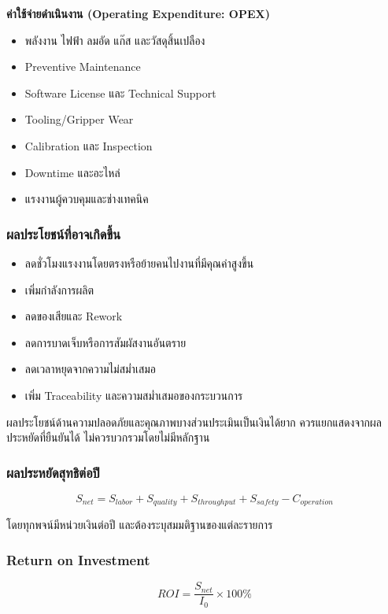 \textbf{ค่าใช้จ่ายดำเนินงาน (Operating Expenditure: OPEX)}

\begin{itemize}
    \item พลังงาน ไฟฟ้า ลมอัด แก๊ส และวัสดุสิ้นเปลือง
    \item Preventive Maintenance
    \item Software License และ Technical Support
    \item Tooling/Gripper Wear
    \item Calibration และ Inspection
    \item Downtime และอะไหล่
    \item แรงงานผู้ควบคุมและช่างเทคนิค
\end{itemize}

\subsubsection{ผลประโยชน์ที่อาจเกิดขึ้น}

\begin{itemize}
    \item ลดชั่วโมงแรงงานโดยตรงหรือย้ายคนไปงานที่มีคุณค่าสูงขึ้น
    \item เพิ่มกำลังการผลิต
    \item ลดของเสียและ Rework
    \item ลดการบาดเจ็บหรือการสัมผัสงานอันตราย
    \item ลดเวลาหยุดจากความไม่สม่ำเสมอ
    \item เพิ่ม Traceability และความสม่ำเสมอของกระบวนการ
\end{itemize}

ผลประโยชน์ด้านความปลอดภัยและคุณภาพบางส่วนประเมินเป็นเงินได้ยาก ควรแยกแสดงจากผลประหยัดที่ยืนยันได้ ไม่ควรบวกรวมโดยไม่มีหลักฐาน

\subsubsection{ผลประหยัดสุทธิต่อปี}

\[
S_{net}=S_{labor}+S_{quality}+S_{throughput}+S_{safety}-C_{operation}
\]

โดยทุกพจน์มีหน่วยเงินต่อปี และต้องระบุสมมติฐานของแต่ละรายการ

\subsubsection{Return on Investment}

\[
ROI=\frac{S_{net}}{I_0}\times100\%
\]

